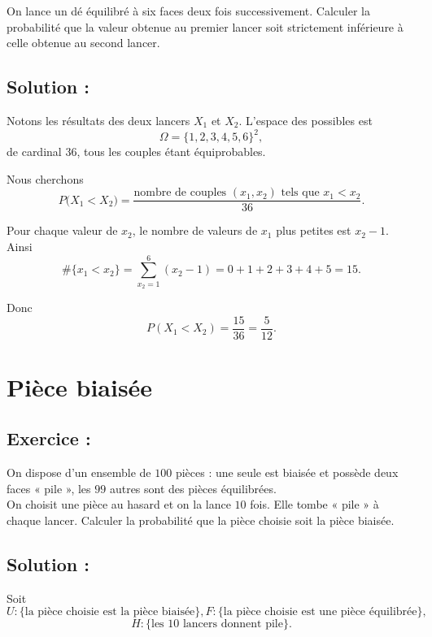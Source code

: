 \begin{exerciseBox}
On lance un dé équilibré à six faces deux fois successivement.
Calculer la probabilité que la valeur obtenue au premier lancer soit strictement inférieure à celle obtenue au second lancer.
\end{exerciseBox}

\subsection*{Solution :}

Notons les résultats des deux lancers $X_1$ et $X_2$.
L’espace des possibles est
\[
\Omega=\{1,2,3,4,5,6\}^2,
\]
de cardinal $36$, tous les couples étant équiprobables.

Nous cherchons
\[
P\bigl(X_1 < X_2\bigr)
= \frac{\text{nombre de couples }(x_1,x_2)\text{ tels que }x_1<x_2}{36}.
\]

Pour chaque valeur de $x_2$, le nombre de valeurs de $x_1$ plus petites est $x_2-1$.
Ainsi
\[
\#\{x_1<x_2\}
= \sum_{x_2=1}^6 (x_2-1)
= 0+1+2+3+4+5
= 15.
\]

Donc
\[
P(X_1 < X_2)
= \frac{15}{36}
= \frac{5}{12}.
\]




\section{Pièce biaisée}

\subsection*{Exercice :}

\begin{exerciseBox}
On dispose d’un ensemble de $100$ pièces : une seule est biaisée et possède deux faces « pile »,
les $99$ autres sont des pièces équilibrées.\\
On choisit une pièce au hasard et on la lance $10$ fois.
Elle tombe « pile » à chaque lancer.
Calculer la probabilité que la pièce choisie soit la pièce biaisée.
\end{exerciseBox}

\subsection*{Solution :}


Soit
\[
U : \{\text{la pièce choisie est la pièce biaisée}\}, 
F : \{\text{la pièce choisie est une pièce équilibrée}\},
\]
\[
H : \{\text{les 10 lancers donnent pile}\}.
\]

